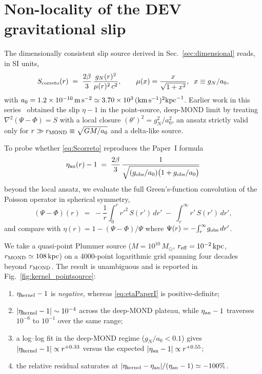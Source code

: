 
\section{Non-locality of the DEV gravitational slip}
\label{sec:kernel}

The dimensionally consistent slip source derived in
Sec.~\ref{sec:dimensional} reads, in SI units,
\begin{equation}
  S_{\rm correto}(r) \;=\; \frac{2\beta}{3}\,
  \frac{g_N(r)^{2}}{\mu(r)^{2}\,c^{2}},
  \qquad
  \mu(x)=\frac{x}{\sqrt{1+x^{2}}},\;\; x \equiv g_N/a_0,
  \label{eq:Scorreto}
\end{equation}
with $a_{0}=1.2\times10^{-10}\,{\rm m\,s^{-2}}\simeq3.70\times10^{3}\,
({\rm km\,s^{-1}})^{2}{\rm kpc}^{-1}$.
Earlier work in this series~\cite{paperI,paperII} obtained the slip
$\eta-1$ in the point-source, deep-MOND limit by treating
$\nabla^{2}(\Psi-\Phi)=S$ with a local closure
$(\theta')^{2}=g_N^{2}/a_0^{2}$, an ansatz strictly valid only for
$r\gg r_{\rm MOND}\equiv\sqrt{GM/a_{0}}$ and a delta-like source.

To probe whether \eqref{eq:Scorreto} reproduces the Paper~I formula
\begin{equation}
  \eta_{\rm an}(r)-1
  \;=\;\frac{2\beta}{3}\,
  \frac{1}{\sqrt{(g_{\rm obs}/a_{0})\bigl(1+g_{\rm obs}/a_{0}\bigr)}}
  \label{eq:etaPaperI}
\end{equation}
beyond the local ansatz, we evaluate the full Green's-function
convolution of the Poisson operator in spherical symmetry,
\begin{equation}
  (\Psi-\Phi)(r) \;=\;
  -\frac{1}{r}\!\int_{0}^{r}\!r'^{2}\,S(r')\,dr'
  \;-\;\int_{r}^{\infty}\!r'\,S(r')\,dr',
  \label{eq:Greens}
\end{equation}
and compare with $\eta(r)=1-(\Psi-\Phi)/\Psi$ where
$\Psi(r)=-\!\int_{r}^{\infty}\!g_{\rm obs}\,dr'$.

We take a quasi-point Plummer source ($M=10^{10}\,M_{\odot}$,
$r_{\rm eff}=10^{-2}\,{\rm kpc}$, $r_{\rm MOND}\simeq108\,{\rm kpc}$)
on a 4000-point logarithmic grid spanning four decades beyond
$r_{\rm MOND}$. The result is unambiguous and is reported in
Fig.~\ref{fig:kernel_pointsource}:
\begin{enumerate}
  \item $\eta_{\rm kernel}-1$ is \emph{negative}, whereas
        \eqref{eq:etaPaperI} is positive-definite;
  \item $|\eta_{\rm kernel}-1|\sim 10^{-4}$ across the deep-MOND
        plateau, while $\eta_{\rm an}-1$ traverses
        $10^{-6}$ to $10^{-1}$ over the same range;
  \item a log--log fit in the deep-MOND regime
        ($g_{N}/a_{0}<0.1$) gives
        $|\eta_{\rm kernel}-1|\propto r^{+0.33}$ versus the expected
        $|\eta_{\rm an}-1|\propto r^{+0.55}$;
  \item the relative residual saturates at
        $|\eta_{\rm kernel}-\eta_{\rm an}|/(\eta_{\rm an}-1)\simeq -100\%$.
\end{enumerate}

